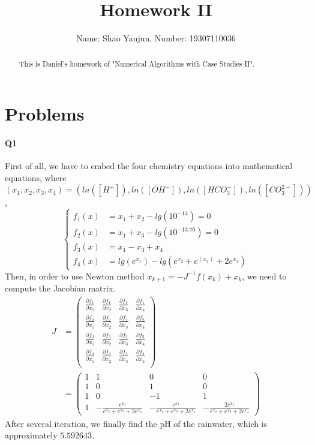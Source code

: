 \documentclass[11pt]{article}
\title{Homework II}
\author{Name: Shao Yanjun, Number: 19307110036}
\begin{document}
\maketitle

\begin{abstract}
This is Daniel's homework of  "Numerical Algorithms with Case Studies II".
\end{abstract}
\section{Problems}
\paragraph{Q1}
First of all, we have to embed the four chemistry equations into mathematical equations, where $(x_1,x_2,x_3,x_4)=(ln([H^+]),ln([OH^-]),ln([HCO_3^-]),ln([CO_3^{2-}]))$,
\begin{equation}
	\left\{
\begin{aligned}
	f_1(x)&=x_1+x_2-lg(10^{-14})=0\\
	f_2(x)&=x_1+x_3-lg(10^{-13.76})=0\\
	f_3(x)&=x_1-x_3+x_4\\
	f_4(x)&=lg(e^{x_1})-lg(e^{x_2}+e^(x_3)+2e^{x_4})
\end{aligned}
\right.
\end{equation}
Then, in order to use Newton method $x_{k+1}=-J^{-1}f(x_k)+x_k$, we need to compute the Jacobian matrix.
\begin{align}
J&=\begin{pmatrix}
	\frac{\partial f_1}{\partial x_1}&
	\frac{\partial f_1}{\partial x_2}&
	\frac{\partial f_1}{\partial x_3}&
	\frac{\partial f_1}{\partial x_4}\\
	\frac{\partial f_2}{\partial x_1}&
	\frac{\partial f_2}{\partial x_2}&
	\frac{\partial f_2}{\partial x_3}&
	\frac{\partial f_2}{\partial x_4}\\
	\frac{\partial f_3}{\partial x_1}&
	\frac{\partial f_3}{\partial x_2}&
	\frac{\partial f_3}{\partial x_3}&
	\frac{\partial f_3}{\partial x_4}\\
	\frac{\partial f_4}{\partial x_1}&
	\frac{\partial f_4}{\partial x_2}&
	\frac{\partial f_4}{\partial x_3}&
	\frac{\partial f_4}{\partial x_4}\\
\end{pmatrix}\\&=
\begin{pmatrix}
	1& 1& 0& 0\\
	1& 0& 1& 0\\
	1& 0& -1& 1\\
	1& -\frac{e^{x_2}}{e^{x_2}+e^{x_3}+2e^{x_4}}&
	-\frac{e^{x_3}}{e^{x_2}+e^{x_3}+2e^{x_4}}&
	-\frac{2e^{x_4}}{e^{x_2}+e^{x_3}+2e^{x_4}}
\end{pmatrix}
\end{align}
After several iteration, we finally find the pH of the rainwater, which is approximately $5.592643$.
\end{document}
